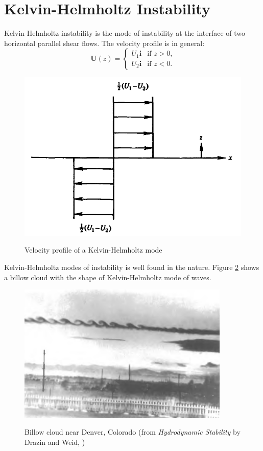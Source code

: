 \section{Kelvin-Helmholtz Instability} Kelvin-Helmholtz instability
is the mode of instability at the interface of two horizontal
parallel shear flows. The velocity profile is in general:
\begin{equation}\label{kh:pro}
\mathbf{U}(z) =
\begin{cases} U_1 \mathbf{i} &\text{if $z>0$,}
\\
U_2 \mathbf{i} &\text{if $z<0$.}
\end{cases}
\end{equation}
\begin{figure}[htpb]
  \centering
  \includegraphics[width=0.9\textheight]{khpro.png}\\
  \caption{Velocity profile of a Kelvin-Helmholtz mode}\label{khpro}
\end{figure}

Kelvin-Helmholtz modes of instability is well found in the nature.
Figure \ref{khphoto} shows a billow cloud with the shape of
Kelvin-Helmholtz mode of waves.
\begin{figure}[htpb]
  \centering
  \includegraphics[width=0.9\textwidth]{khphoto.png}\\
  \caption{Billow cloud near Denver, Colorado (from \emph{Hydrodynamic Stability} by Drazin and Weid, \cite{Drazin})}\label{khphoto}
\end{figure}
